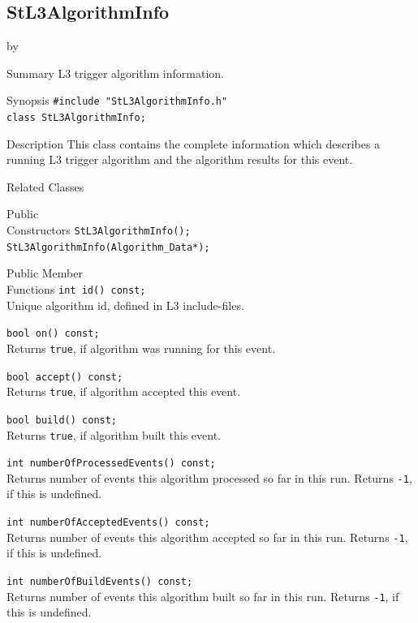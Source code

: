 \documentclass[twoside]{article}
\newcommand{\entrylabel}[1]{\mbox{\textbf{{#1}}}\hfil}%
\newenvironment{entry}
{\begin{list}{}%
    {\renewcommand{\makelabel}{\entrylabel}%
     \setlength{\labelwidth}{90pt}%
     \setlength{\leftmargin}{\labelwidth}
     \advance\leftmargin by \labelsep%
      }%
    }%
  {\end{list}}
\newcommand{\Entrylabel}[1]%
{\raisebox{0pt}[1ex][0pt]{\makebox[\labelwidth][l]%
    {\parbox[t]{\labelwidth}{\hspace{0pt}\textbf{{#1}}}}}}
\newenvironment{Entry}%
{\renewcommand{\entrylabel}{\Entrylabel}\begin{entry}}%
  {\end{entry}}
\begin{document}
\subsection{StL3AlgorithmInfo}
\label{sec:StL3AlgorithmInfo}
\begin{Entry}
\item[Summary] L3 trigger algorithm information.
\item[Synopsis]
    \verb+#include "StL3AlgorithmInfo.h"+\\
    \verb+class StL3AlgorithmInfo;+\\
\item[Description] This class contains the complete information
        which describes a running L3 trigger algorithm and the
        algorithm results for this event.
\item[Related Classes]
\item[Public\\ Constructors]
    \verb+StL3AlgorithmInfo();+\\
    \verb+StL3AlgorithmInfo(Algorithm_Data*);+\\
\item[Public Member\\ Functions]
    \verb+int id() const;+\\
        Unique algorithm id, defined in L3 include-files.

    \verb+bool on() const;+\\
        Returns \texttt{true}, if algorithm was running for this
        event.

    \verb+bool accept() const;+\\
        Returns \texttt{true}, if algorithm accepted this event.

    \verb+bool build() const;+\\
        Returns \texttt{true}, if algorithm built this event.

    \verb+int numberOfProcessedEvents() const;+\\
        Returns number of events this algorithm processed so far in
        this run. Returns \texttt{-1}, if this is undefined.

    \verb+int numberOfAcceptedEvents() const;+\\
        Returns number of events this algorithm accepted so far in
        this run. Returns \texttt{-1}, if this is undefined.

    \verb+int numberOfBuildEvents() const;+\\
        Returns number of events this algorithm built so far in
        this run. Returns \texttt{-1}, if this is undefined.


\end{Entry}
\end{document}
